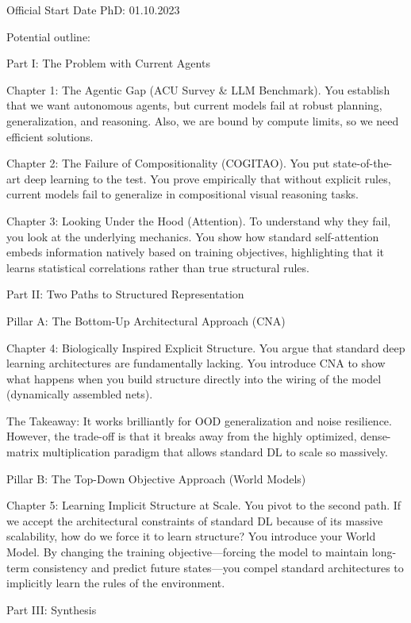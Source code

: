 Official Start Date PhD: 01.10.2023

Potential outline:


Part I: The Problem with Current Agents

Chapter 1: The Agentic Gap (ACU Survey & LLM Benchmark). You establish that we want autonomous agents, but current models fail at robust planning, generalization, and reasoning. Also, we are bound by compute limits, so we need efficient solutions.

Chapter 2: The Failure of Compositionality (COGITAO). You put state-of-the-art deep learning to the test. You prove empirically that without explicit rules, current models fail to generalize in compositional visual reasoning tasks.

Chapter 3: Looking Under the Hood (Attention). To understand why they fail, you look at the underlying mechanics. You show how standard self-attention embeds information natively based on training objectives, highlighting that it learns statistical correlations rather than true structural rules.



Part II: Two Paths to Structured Representation



Pillar A: The Bottom-Up Architectural Approach (CNA)

Chapter 4: Biologically Inspired Explicit Structure. You argue that standard deep learning architectures are fundamentally lacking. You introduce CNA to show what happens when you build structure directly into the wiring of the model (dynamically assembled nets).

The Takeaway: It works brilliantly for OOD generalization and noise resilience. However, the trade-off is that it breaks away from the highly optimized, dense-matrix multiplication paradigm that allows standard DL to scale so massively.

Pillar B: The Top-Down Objective Approach (World Models)

Chapter 5: Learning Implicit Structure at Scale. You pivot to the second path. If we accept the architectural constraints of standard DL because of its massive scalability, how do we force it to learn structure? You introduce your World Model. By changing the training objective—forcing the model to maintain long-term consistency and predict future states—you compel standard architectures to implicitly learn the rules of the environment.



Part III: Synthesis

